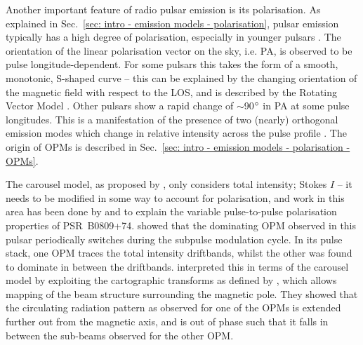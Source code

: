 Another important feature of radio pulsar emission is its polarisation. As explained in Sec.~\ref{sec: intro - emission models - polarisation}, pulsar emission typically has a high degree of polarisation, especially in younger pulsars \citep[e.g.][]{GLxx1995}. The orientation of the linear polarisation vector on the sky, i.e. PA, is observed to be pulse longitude-dependent. For some pulsars this takes the form of a smooth, monotonic, S-shaped curve -- this can be explained by the changing orientation of the magnetic field with respect to the LOS, and is described by the Rotating Vector Model \citep[RVM;][see Sec.~\ref{sec: intro - emission models - polarisation - RVM}]{RCxx1969,Kxxx1970}. Other pulsars show a rapid change of $\sim$90$^\circ$ in PA at some pulse longitudes. This is a manifestation of the presence of two (nearly) orthogonal emission modes which change in relative intensity across the pulse profile \citep[e.g.][]{RCBx1974,BRCx1976}. The origin of OPMs is described in Sec.~\ref{sec: intro - emission models - polarisation - OPMs}. %

The carousel model, as proposed by \citet{RSxx1975}, only considers total intensity; Stokes $I$ -- it needs to be modified in some way to account for polarisation, and work in this area has been done by \citet{RRS+2002} and \citet{RRL+2006} to explain the variable pulse-to-pulse polarisation properties of PSR~B0809+74. \citet{RRS+2002} showed that the dominating OPM observed in this pulsar periodically switches during the subpulse modulation cycle. In its pulse stack, one OPM traces the total intensity driftbands, whilst the other was found to dominate in between the driftbands. \citet{RRL+2006} interpreted this in terms of the carousel model by exploiting the cartographic transforms as defined by \citet{DRxx2001}, which allows mapping of the beam structure surrounding the magnetic pole. They showed that the circulating radiation pattern as observed for one of the OPMs is extended further out from the magnetic axis, and is out of phase such that it falls in between the sub-beams observed for the other OPM.

